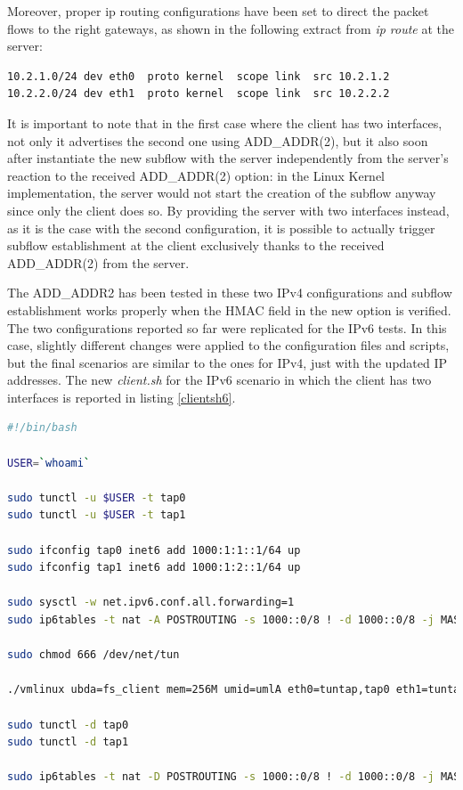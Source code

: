 Moreover, proper ip routing configurations have been set to direct the packet flows to the right gateways, as shown in the following extract from \textit{ip route} at the server:

\begin{verbatim}
10.2.1.0/24 dev eth0  proto kernel  scope link  src 10.2.1.2 
10.2.2.0/24 dev eth1  proto kernel  scope link  src 10.2.2.2 
\end{verbatim}
 
It is important to note that in the first case where the client has two interfaces, not only it advertises the second one using ADD\_ADDR(2), but it also soon after instantiate the new subflow with the server independently from the server's reaction to the received ADD\_ADDR(2) option: in the Linux Kernel implementation, the server would not start the creation of the subflow anyway since only the client does so. By providing the server with two interfaces instead, as it is the case with the second configuration, it is possible to actually trigger subflow establishment at the client exclusively thanks to the received ADD\_ADDR(2) from the server. 

The ADD\_ADDR2 has been tested in these two IPv4 configurations and subflow establishment works properly when the HMAC field in the new option is verified.
The two configurations reported so far were replicated for the IPv6 tests. In this case, slightly different changes were applied to the configuration files and scripts, but the final scenarios are similar to the ones for IPv4, just with the updated IP addresses. The new \textit{client.sh} for the IPv6 scenario in which the client has two interfaces is reported in listing \ref{clientsh6}.

\begin{lstlisting}[language=bash, caption=\textit{client.sh} for IPv6 setup, label=clientsh6]
#!/bin/bash

USER=`whoami`

sudo tunctl -u $USER -t tap0
sudo tunctl -u $USER -t tap1

sudo ifconfig tap0 inet6 add 1000:1:1::1/64 up
sudo ifconfig tap1 inet6 add 1000:1:2::1/64 up

sudo sysctl -w net.ipv6.conf.all.forwarding=1
sudo ip6tables -t nat -A POSTROUTING -s 1000::0/8 ! -d 1000::0/8 -j MASQUERADE

sudo chmod 666 /dev/net/tun

./vmlinux ubda=fs_client mem=256M umid=umlA eth0=tuntap,tap0 eth1=tuntap,tap1

sudo tunctl -d tap0
sudo tunctl -d tap1

sudo ip6tables -t nat -D POSTROUTING -s 1000::0/8 ! -d 1000::0/8 -j MASQUERADE
\end{lstlisting}

